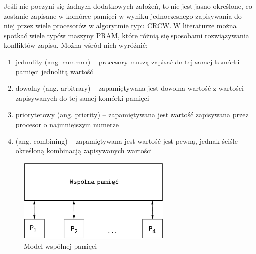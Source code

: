 Jeśli nie poczyni się żadnych dodatkowych założeń, to nie jest jasno określone, co zostanie zapisane w komórce pamięci w wyniku jednoczesnego zapisywania do niej przez wiele procesorów w algorytmie typu CRCW. W literaturze można spotkać wiele typów maszyny PRAM, które różnią się sposobami rozwiązywania konfliktów zapisu. Można wśród nich wyróżnić\cite{Cormen94}:

\begin{enumerate}
\item jednolity (ang. common) – procesory muszą zapisać do tej samej komórki pamięci jednolitą wartość
\item dowolny (ang. arbitrary) – zapamiętywana jest dowolna wartość z wartości zapisywanych do tej samej komórki pamięci
\item priorytetowy (ang. priority) – zapamiętywana jest wartość zapisywana przez procesor o najmniejszym numerze
\item (ang. combining) – zapamiętywana jest wartość jest pewną, jednak ściśle określoną kombinacją zapisywanych wartości
\end{enumerate}

\begin{figure}[h]
\centering
\includegraphics[width=20em]{images/Rys4.eps}
\caption{Model wspólnej pamięci}
\label{fig:model_shared}
\end{figure}